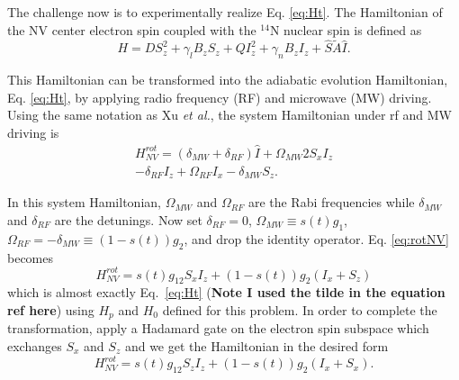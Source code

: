 \documentclass[%
 reprint,
 amsmath,amssymb,
 aps,
]{revtex4-1}
\begin{document}
	The challenge now is to experimentally realize Eq. \ref{eq:Ht}. The Hamiltonian of the NV center electron spin coupled with the $^{14}$N nuclear spin is defined as
	\begin{equation}
		H = DS_z^2 + \gamma_lB_zS_z + QI_z^2 + \gamma_nB_zI_z + \hat{S}\tilde{A}\hat{I}.
	\end{equation}

	This Hamiltonian can be transformed into the adiabatic evolution Hamiltonian, Eq. \ref{eq:Ht}, by applying radio frequency (RF) and microwave (MW) driving\cite{Kong2016}. Using the same notation as Xu \textit{et al.}, the system Hamiltonian under rf and MW driving is
	\begin{equation}
	\begin{split}
		H^{rot}_{NV} = \left( \delta_{MW} + \delta_{RF} \right)\hat{I} + \Omega_{MW}2S_xI_z \\ - \delta_{RF}I_z + \Omega_{RF}I_x - \delta_{MW}S_z.
	\end{split}
	\label{eq:rotNV}
	\end{equation}
	
	In this system Hamiltonian, $\Omega_{MW}$ and $\Omega_{RF}$ are the Rabi frequencies while $\delta_{MW}$ and $\delta_{RF}$ are the detunings. Now set $\delta_{RF}=0$, $\Omega_{MW}\equiv s(t)g_1$, $\Omega_{RF}=-\delta_{MW}\equiv \left(1-s(t)\right)g_2$, and drop the identity operator. Eq. \ref{eq:rotNV} becomes
	\begin{equation}
		H^{rot}_{NV} = s(t)g_12S_xI_z + \left(1-s(t)\right)g_2\left(I_x + S_z\right)
	\end{equation}
which is almost exactly Eq.~\ref{eq:Ht} (\textbf{Note I used the tilde in the equation ref here}) using $H_p$ and $H_0$ defined for this problem. In order to complete the transformation, apply a Hadamard gate on the electron spin subspace which exchanges $S_x$ and $S_z$ and we get the Hamiltonian in the desired form
	\begin{equation}
		H^{rot}_{NV} = s(t)g_12S_zI_z + \left(1-s(t)\right)g_2\left(I_x + S_x\right).
	\end{equation}
	
\end{document}
